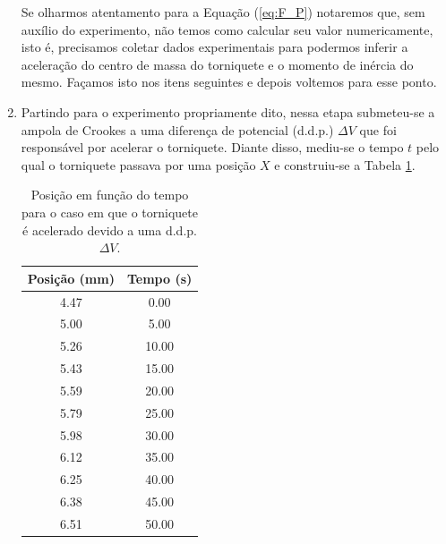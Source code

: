 \documentclass[12pt,a4paper]{article}
\begin{document}
\begin{enumerate}
    Se olharmos atentamento para a Equação (\ref{eq:F_P}) notaremos que, sem auxílio do experimento, não temos como calcular seu valor numericamente, isto é, precisamos coletar dados experimentais para podermos inferir a aceleração do centro de massa do torniquete e o momento de inércia do mesmo. Façamos isto nos itens seguintes e depois voltemos para esse ponto.



    \item Partindo para o experimento propriamente dito, nessa etapa submeteu-se a ampola de Crookes a uma diferença de potencial (d.d.p.) $\Delta V$ que foi responsável por acelerar o torniquete. Diante disso, mediu-se o tempo $t$ pelo qual o torniquete passava por uma posição $X$ e construiu-se a Tabela \ref{tab:Atividade3-3}.
    
    \begin{table}[htb!]
        \centering
        \caption{Posição em função do tempo para o caso em que o torniquete é acelerado devido a uma d.d.p. $\Delta V$.}
        \begin{tabular}{|c|c|}
            \hline
            Posição (mm) & Tempo (s) \\
            \hline
            4.47 & 0.00 \\
            5.00 & 5.00 \\
            5.26 & 10.00 \\
            5.43 & 15.00 \\
            5.59 & 20.00 \\
            5.79 & 25.00 \\
            5.98 & 30.00 \\
            6.12 & 35.00 \\
            6.25 & 40.00 \\
            6.38 & 45.00 \\
            6.51 & 50.00 \\
            \hline
        \end{tabular}
        \label{tab:Atividade3-3}
    \end{table}


\end{enumerate}
\end{document}
